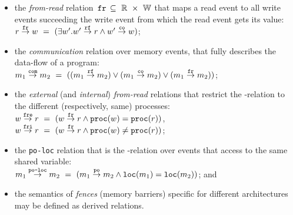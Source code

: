 \begin{itemize}

    \item the \textit{from-read} relation $\,\texttt{fr}\, \subseteq~\mathbb{R}~\times~\mathbb{W}$ that maps a read event to all write events succeeding the write event from which the read event gets its value: \\
    $r \overset{\texttt{fr}}{\rightarrow} w ~=~ (\exists w' . w' \overset{\texttt{rf}}{\rightarrow} r \land w' \overset{\texttt{co}}{\rightarrow} w)$;


    \item the \textit{communication} relation \com over memory events, that fully describes the data-flow of a program: \\
    $m_1 \overset{\texttt{com}}{\rightarrow} m_2~=~((m_1\overset{\texttt{rf}}{\rightarrow}m_2) \lor (m_1\overset{\texttt{co}}{\rightarrow}m_2) \lor (m_1\overset{\texttt{fr}}{\rightarrow}m_2))$;

    \item the \textit{external} (and \textit{internal}) \textit{from-read} relations that restrict the \fr-relation to the different (respectively, same) processes: \\
    $w \overset{\texttt{fre}}{\rightarrow} r ~=~ (w \overset{\texttt{fr}}{\rightarrow} r \land \texttt{proc}(w) = \texttt{proc}(r))$, \\
    $w \overset{\texttt{fri}}{\rightarrow} r ~=~ (w \overset{\texttt{fr}}{\rightarrow} r \land \texttt{proc}(w) \neq \texttt{proc}(r))$;
    
    \item the \texttt{po-loc} relation that is the \po-relation over events that access to the same shared variable: \\
    $m_1 \overset{\texttt{po-loc}}{\rightarrow} m_2 ~=~ (m_1 \overset{\texttt{po}}{\rightarrow} m_2 \land \texttt{loc}(m_1) = \texttt{loc}(m_2))$; and

    \item the semantics of \textit{fences} (memory barriers) specific for different architectures may be defined as derived relations.


\end{itemize}


